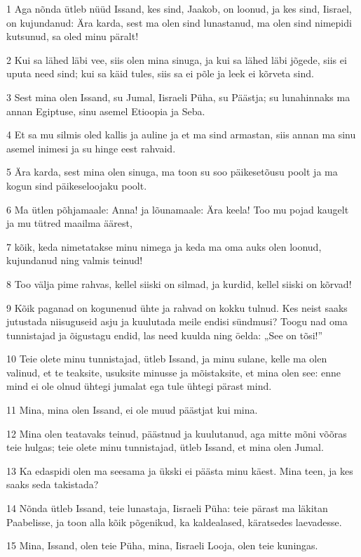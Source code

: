 \par 1 Aga nõnda ütleb nüüd Issand, kes sind, Jaakob, on loonud, ja kes sind, Iisrael, on kujundanud: Ära karda, sest ma olen sind lunastanud, ma olen sind nimepidi kutsunud, sa oled minu päralt!
\par 2 Kui sa lähed läbi vee, siis olen mina sinuga, ja kui sa lähed läbi jõgede, siis ei uputa need sind; kui sa käid tules, siis sa ei põle ja leek ei kõrveta sind.
\par 3 Sest mina olen Issand, su Jumal, Iisraeli Püha, su Päästja; su lunahinnaks ma annan Egiptuse, sinu asemel Etioopia ja Seba.
\par 4 Et sa mu silmis oled kallis ja auline ja et ma sind armastan, siis annan ma sinu asemel inimesi ja su hinge eest rahvaid.
\par 5 Ära karda, sest mina olen sinuga, ma toon su soo päikesetõusu poolt ja ma kogun sind päikeseloojaku poolt.
\par 6 Ma ütlen põhjamaale: Anna! ja lõunamaale: Ära keela! Too mu pojad kaugelt ja mu tütred maailma äärest,
\par 7 kõik, keda nimetatakse minu nimega ja keda ma oma auks olen loonud, kujundanud ning valmis teinud!
\par 8 Too välja pime rahvas, kellel siiski on silmad, ja kurdid, kellel siiski on kõrvad!
\par 9 Kõik paganad on kogunenud ühte ja rahvad on kokku tulnud. Kes neist saaks jutustada niisuguseid asju ja kuulutada meile endisi sündmusi? Toogu nad oma tunnistajad ja õigustagu endid, las need kuulda ning öelda: „See on tõsi!”
\par 10 Teie olete minu tunnistajad, ütleb Issand, ja minu sulane, kelle ma olen valinud, et te teaksite, usuksite minusse ja mõistaksite, et mina olen see: enne mind ei ole olnud ühtegi jumalat ega tule ühtegi pärast mind.
\par 11 Mina, mina olen Issand, ei ole muud päästjat kui mina.
\par 12 Mina olen teatavaks teinud, päästnud ja kuulutanud, aga mitte mõni võõras teie hulgas; teie olete minu tunnistajad, ütleb Issand, et mina olen Jumal.
\par 13 Ka edaspidi olen ma seesama ja ükski ei päästa minu käest. Mina teen, ja kes saaks seda takistada?
\par 14 Nõnda ütleb Issand, teie lunastaja, Iisraeli Püha: teie pärast ma läkitan Paabelisse, ja toon alla kõik põgenikud, ka kaldealased, käratsedes laevadesse.
\par 15 Mina, Issand, olen teie Püha, mina, Iisraeli Looja, olen teie kuningas.
